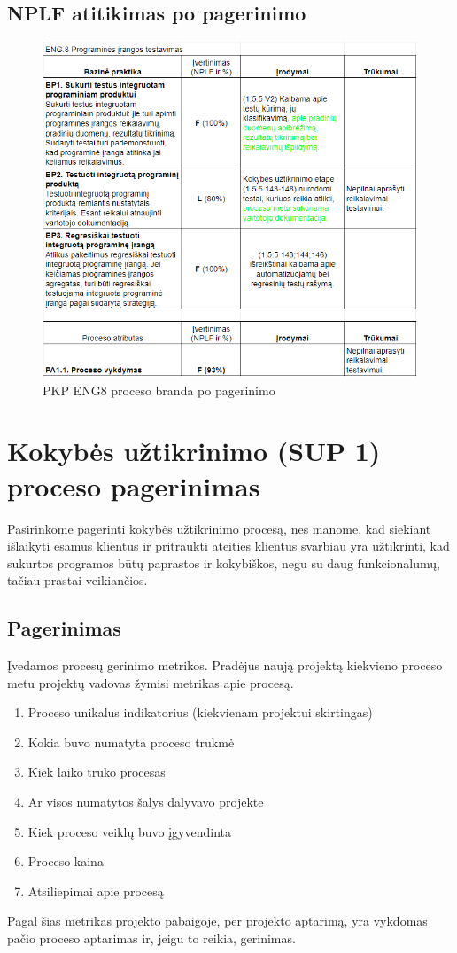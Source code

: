 \documentclass{VUMIFPSkursinis}
\begin{document}
	\subsection{NPLF atitikimas po pagerinimo}
	\begin{figure}[!htbp]
		\includegraphics[scale=0.9]{img/eng8_po_pakeitimo}
		\caption{PKP ENG8 proceso branda po pagerinimo} %
		\label{img:pkpPries}
	\end{figure}
	
\section{Kokybės užtikrinimo (SUP 1) proceso pagerinimas}
	Pasirinkome pagerinti kokybės užtikrinimo procesą, nes manome, kad siekiant išlaikyti esamus klientus ir pritraukti ateities klientus svarbiau yra užtikrinti, 
	kad sukurtos programos būtų paprastos ir kokybiškos, negu su daug funkcionalumų, tačiau prastai veikiančios.

			\subsection{Pagerinimas}
				Įvedamos procesų gerinimo metrikos.
				Pradėjus naują projektą kiekvieno proceso metu projektų vadovas žymisi metrikas apie procesą.
					\begin{enumerate}
						\item{Proceso unikalus indikatorius (kiekvienam projektui skirtingas)}
						\item{Kokia buvo numatyta proceso trukmė}
						\item{Kiek laiko truko procesas}
						\item{Ar visos numatytos šalys dalyvavo projekte}
						\item{Kiek proceso veiklų buvo įgyvendinta}
						\item{Proceso kaina}
						\item{Atsiliepimai apie procesą}
					\end{enumerate}
				Pagal šias metrikas projekto pabaigoje, per projekto aptarimą, yra vykdomas pačio proceso aptarimas ir, jeigu to reikia, gerinimas.
\end{document}
